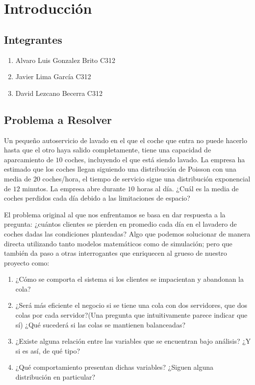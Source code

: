 \documentclass[14pt]{extarticle}
\begin{document}
\section{Introducción}

\subsection{Integrantes}

\begin{enumerate}
  \item Alvaro Luis Gonzalez Brito C312
  \item Javier Lima García C312
  \item David Lezcano Becerra C312
\end{enumerate}

\subsection{Problema a Resolver}

\begin{tcolorbox}[colback=blue!5!white,colframe=blue!75!black, title = Lavadero de Coches]
    
    Un pequeño autoservicio de lavado en el que el coche que entra no puede
    hacerlo hasta que el otro haya salido completamente, tiene una capacidad de
    aparcamiento de $10$ coches, incluyendo el que está siendo lavado. La empresa ha
    estimado que los coches llegan siguiendo una distribución de Poisson con una
    media de $20$ coches/hora, el tiempo de servicio sigue una distribución exponencial
    de $12$ minutos. La empresa abre durante $10$ horas al día. ¿Cuál es la media de
    coches perdidos cada día debido a las limitaciones de espacio?

\end{tcolorbox}

El problema original al que nos enfrentamos se basa en dar respuesta a la pregunta: ¿cuántos clientes se pierden en promedio cada día en el lavadero de coches dadas las condiciones planteadas? Algo que podemos solucionar de manera directa utilizando tanto modelos matemáticos como de simulación; pero que también da paso a otras interrogantes que enriquecen al grueso de nuestro proyecto como:

\begin{enumerate}
    \item ¿Cómo se comporta el sistema si los clientes se impacientan y abandonan la cola?
    \item ¿Será más eficiente el negocio si se tiene una cola con dos servidores, que dos colas por cada servidor?(Una pregunta que intuitivamente parece indicar que sí) ¿Qué sucederá si las colas se mantienen balanceadas?
    \item ¿Existe alguna relación entre las variables que se encuentran bajo análisis? ¿Y si es así, de qué tipo?
    \item ¿Qué comportamiento presentan dichas variables? ¿Siguen alguna distribución en particular?
\end{enumerate}
\end{document}
